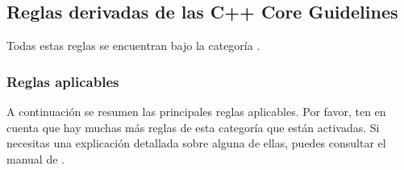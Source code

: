 \subsection{Reglas derivadas de las C++ Core Guidelines}

Todas estas reglas se encuentran bajo la categoría .

\subsubsection{Reglas aplicables}

A continuación se resumen las principales reglas aplicables.
Por favor, ten en cuenta que hay muchas más reglas de esta categoría que están
activadas. Si necesitas una explicación detallada sobre alguna de ellas, puedes
consultar el manual de .

